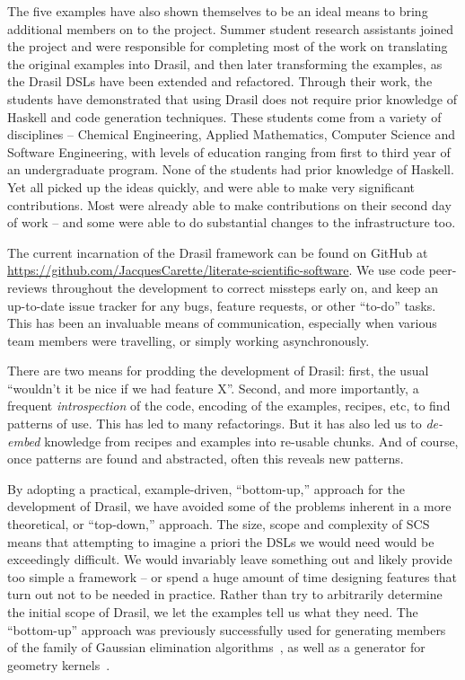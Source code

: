 \documentclass[sigconf]{acmart}
\begin{document}
The five examples have also shown themselves to be an ideal means to bring
additional members on to the project.  Summer student research assistants
joined the project and were responsible for completing most of the work on
translating the original examples into Drasil, and then later transforming the
examples, as the Drasil DSLs have been extended and refactored.  Through their
work, the students have demonstrated that using Drasil does not require prior
knowledge of Haskell and code generation techniques.  These students come from
a variety of disciplines -- Chemical Engineering, Applied Mathematics, Computer
Science and Software Engineering, with levels of education ranging from first
to third year of an undergraduate program. None of the students had prior 
knowledge of Haskell. Yet all picked up the ideas quickly, and were able to make 
very significant contributions. Most were already able to make contributions on 
their second day of work -- and some were able to do substantial changes to the 
infrastructure too.

The current incarnation of the Drasil framework can be found on GitHub at 
\href{https://github.com/JacquesCarette/literate-scientific-software}
{https://github.com/JacquesCarette/literate-scientific-software}. We use code
peer-reviews throughout the development to correct missteps early on, and 
keep an up-to-date issue tracker for any bugs, feature requests, or other 
``to-do'' tasks. This has been an invaluable means of communication, 
especially when various team members were travelling, or simply working
asynchronously.

There are two means for prodding the development of Drasil:  first, the
usual ``wouldn't it be nice if we had feature X''.  Second, and more
importantly, a frequent \emph{introspection} of the code, encoding of the
examples, recipes, etc, to find patterns of use.  This has led to many
refactorings.  But it has also led us to \emph{de-embed} knowledge from
recipes and examples into re-usable chunks.  And of course, once patterns
are found and abstracted, often this reveals new patterns.

By adopting a practical, example-driven, ``bottom-up,'' approach for the
development of Drasil, we have avoided some of the problems inherent in a more
theoretical, or ``top-down,'' approach.  The size, scope and complexity of SCS
means that attempting to imagine a priori the DSLs we would need would be
exceedingly difficult.  We would invariably leave something out and likely
provide too simple a framework -- or spend a huge amount of time designing
features that turn out not to be needed in practice.  Rather than try to
arbitrarily determine the initial scope of Drasil, we let the examples tell us
what they need. The ``bottom-up'' approach was previously successfully used for
generating members of the family of Gaussian elimination
algorithms~\cite{Carette2006}, as well as a generator for geometry
kernels~\cite{CaretteEtAl2011}.
\end{document}
